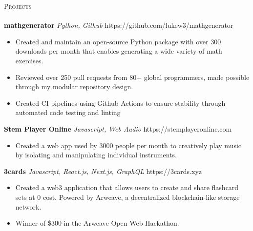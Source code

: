 \documentclass[letterpaper]{article}
\newcommand{\lineunder} {
    \vspace*{-8pt} \\
    \hspace*{-18pt} \hrulefill \\
}
\newcommand{\header} [1] {
    {\hspace*{-18pt}\vspace*{6pt} \textsc{#1}}
    \vspace*{-6pt} \lineunder
}
\begin{document}
\header{Projects}

    {\textbf{mathgenerator}} {\sl Python, Github} \hfill https://github.com/lukew3/mathgenerator\\
    \vspace*{-3mm}
    \begin{itemize} \itemsep -1mm
    
        \item Created and maintain an open-source Python package with over 300 downloads per month that enables generating a wide variety of math exercises.

        \item Reviewed over 250 pull requests from 80+ global programmers, made possible through my modular repository design.

        \item Created CI pipelines using Github Actions to ensure stability through automated code testing and linting

    \end{itemize}
    \vspace*{-2mm}

    {\textbf{Stem Player Online}} {\sl Javascript, Web Audio} \hfill https://stemplayeronline.com\\
    \vspace*{-3mm}
    \begin{itemize} \itemsep -1mm

        \item Created a web app used by 3000 people per month to creatively play music by isolating and manipulating individual instruments.
        
    \end{itemize}
    \vspace*{-2mm}

    {\textbf{3cards}} {\sl Javascript, React.js, Next.js, GraphQL} \hfill https://3cards.xyz\\
    \vspace*{-3mm}
    \begin{itemize} \itemsep -1mm

        \item Created a web3 application that allows users to create and share flashcard sets at 0 cost. Powered by Arweave, a decentralized blockchain-like storage network.
        \item Winner of \$300 in the Arweave Open Web Hackathon.
        
    \end{itemize}
    \vspace*{-2mm}
\end{document}
